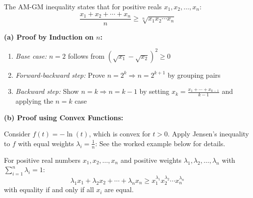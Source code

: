 \documentclass[12pt]{article}
\newenvironment{remark}[1][]{%
  \begin{remarkbox}[title={\bfseries Remark~\thetcbcounter\ifx\relax#1\relax\else\ (#1)\fi}]%
}{%
  \end{remarkbox}%
}
\begin{document}
\begin{remark}[Two Approaches to Proving General Inequality]
The AM-GM inequality states that for positive reals $x_1, x_2, \ldots, x_n$:
\[ \frac{x_1 + x_2 + \cdots + x_n}{n} \geq \sqrt[n]{x_1 x_2 \cdots x_n} \]

\textbf{(a) Proof by Induction on $n$:}
\begin{enumerate}
    \item \textit{Base case:} $n=2$ follows from $(\sqrt{x_1} - \sqrt{x_2})^2 \geq 0$
    \item \textit{Forward-backward step:} Prove $n=2^k \Rightarrow n=2^{k+1}$ by grouping pairs
    \item \textit{Backward step:} Show $n=k \Rightarrow n=k-1$ by setting $x_k = \frac{x_1 + \cdots + x_{k-1}}{k-1}$ and applying the $n=k$ case
\end{enumerate}

\textbf{(b) Proof using Convex Functions:}

 Consider $f(t) = -\ln(t)$, which is convex for $t > 0$. Apply Jensen's inequality to $f$ with equal weights $\lambda_i = \frac{1}{n}$:
 See the worked example below for details.

\end{remark}

\begin{theorembox}[title={\bfseries Weighted AM-GM Inequality}]
For positive real numbers $x_1, x_2, \ldots, x_n$ and positive weights $\lambda_1, \lambda_2, \ldots, \lambda_n$ with $\sum_{i=1}^n \lambda_i = 1$:
\[
\lambda_1 x_1 + \lambda_2 x_2 + \cdots + \lambda_n x_n \ge x_1^{\lambda_1} x_2^{\lambda_2} \cdots x_n^{\lambda_n}
\]
with equality if and only if all $x_i$ are equal.
\end{theorembox}
\end{document}
